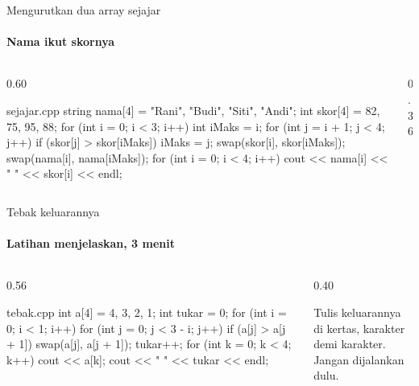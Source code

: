 \documentclass[t]{beamer}
\begin{document}
\begin{frame}[fragile]{Mengurutkan dua array sejajar}
\framesubtitle{Nama ikut skornya}
\begin{columns}[T]
\begin{column}{0.60\textwidth}
\begin{Kode}[listing options={style=ITERACodeKecil}]{sejajar.cpp}
string nama[4] = {"Rani", "Budi", "Siti", "Andi"};
int skor[4] = {82, 75, 95, 88};
for (int i = 0; i < 3; i++) {
    int iMaks = i;
    for (int j = i + 1; j < 4; j++)
        if (skor[j] > skor[iMaks]) iMaks = j;
    swap(skor[i], skor[iMaks]);
    swap(nama[i], nama[iMaks]);
}
for (int i = 0; i < 4; i++)
    cout << nama[i] << " " << skor[i] << endl;
\end{Kode}
\end{column}
\begin{column}{0.36\textwidth}
\end{column}
\end{columns}
\end{frame}

\begin{frame}[fragile]{Tebak keluarannya}
\framesubtitle{Latihan menjelaskan, 3 menit}
\begin{columns}[T]
\begin{column}{0.56\textwidth}
\begin{Kode}[listing options={style=ITERACodeKecil}]{tebak.cpp}
int a[4] = {4, 3, 2, 1};
int tukar = 0;
for (int i = 0; i < 1; i++) {
    for (int j = 0; j < 3 - i; j++) {
        if (a[j] > a[j + 1]) {
            swap(a[j], a[j + 1]);
            tukar++;
        }
    }
}
for (int k = 0; k < 4; k++) cout << a[k];
cout << " " << tukar << endl;
\end{Kode}
\end{column}
\begin{column}{0.40\textwidth}
\begin{Catatan}
Tulis keluarannya di kertas, karakter demi karakter. Jangan dijalankan dulu.
\end{Catatan}
\end{column}
\end{columns}
\end{frame}
\end{document}
